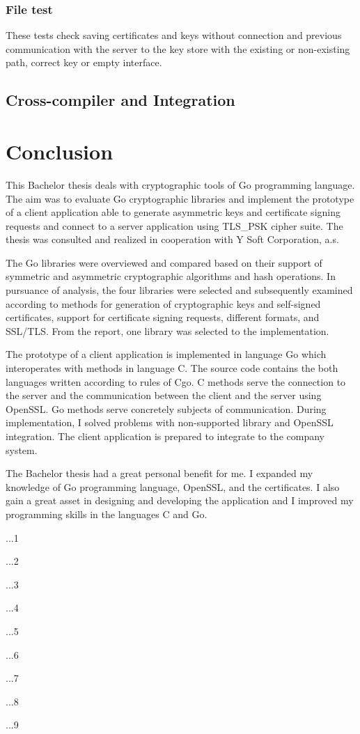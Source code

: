 \documentclass[
  twoside, 12pt, 
  printed, %
  notable,   %
  lof,     %
  lot,     %
]{fithesis3}
\begin{document}
\subsection{File test}
These tests check saving certificates and keys without connection and previous communication with 
the server to the key store with the existing or non-existing path, correct key or empty 
interface. 

\section{Cross-compiler and Integration}




\chapter{Conclusion}
This Bachelor thesis deals with cryptographic tools of Go programming language. The aim was to 
evaluate Go cryptographic libraries and implement the prototype of a client application able to 
generate asymmetric keys and certificate signing requests and connect to a server application 
using TLS\_PSK cipher suite. The thesis was consulted and realized in cooperation with Y Soft 
Corporation, a.s.

The Go libraries were overviewed and compared based on their support of symmetric and asymmetric 
cryptographic algorithms and hash operations. In pursuance of analysis, the four libraries were 
selected and subsequently examined according to methods for generation of cryptographic keys and 
self-signed certificates, support for certificate signing requests, different formats, and 
SSL/TLS. From the report, one library was selected to the implementation.

The prototype of a client application is implemented in language Go which interoperates with 
methods in language C. The source code contains the both languages written according to rules of 
Cgo. C methods serve the connection to the server and the communication between the client and the 
server using OpenSSL. Go methods serve concretely subjects of communication. During 
implementation, I solved problems with non-supported library and OpenSSL integration. The client
application is prepared to integrate to the company system.

The Bachelor thesis had a great personal benefit for me. I expanded my knowledge of Go programming 
language, OpenSSL, and the certificates. I also gain a great asset in designing and developing the 
application and I improved my programming skills in the languages C and Go. 

...1

...2

...3

...4

...5

...6

...7

...8

...9

\printbibliography
\end{document}
